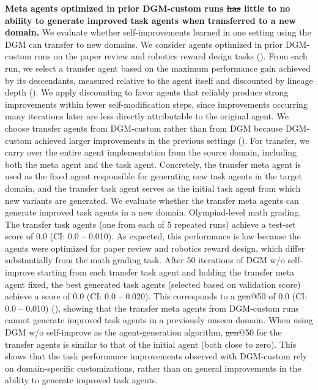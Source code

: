 \documentclass[]{fairmeta}
\providecommand{\DIFaddtex}[1]{{\protect\color{blue}\uwave{#1}}} %
\providecommand{\DIFdeltex}[1]{{\protect\color{red}\sout{#1}}}                      %
\providecommand{\DIFaddbegin}{} %
\providecommand{\DIFaddend}{} %
\providecommand{\DIFdelbegin}{} %
\providecommand{\DIFdelend}{} %
\providecommand{\DIFadd}[1]{\texorpdfstring{\DIFaddtex{#1}}{#1}} %
\providecommand{\DIFdel}[1]{\texorpdfstring{\DIFdeltex{#1}}{}} %
\begin{document}
\textbf{Meta agents optimized in prior DGM-custom runs \DIFdelbegin \DIFdel{has }\DIFdelend \DIFaddbegin \DIFadd{have }\DIFaddend little to no ability to generate improved task agents when transferred to a new domain.}
We evaluate whether self-improvements learned in one setting using the DGM can transfer to new domains. We consider agents optimized in prior DGM-custom runs on the paper review and robotics reward design tasks (). From each run, we select a transfer agent based on the maximum performance gain achieved by its descendants, measured relative to the agent itself and discounted by lineage depth (). We apply discounting to favor agents that reliably produce strong improvements within fewer self-modification steps, since improvements occurring many iterations later are less directly attributable to the original agent. We choose transfer agents from DGM-custom rather than from DGM because DGM-custom achieved larger improvements in the previous settings ().
For transfer, we carry over the entire agent implementation from the source domain, including both the meta agent and the task agent. Concretely, the transfer meta agent is used as the fixed agent responsible for generating new task agents in the target domain, and the transfer task agent serves as the initial task agent from which new variants are generated.
We evaluate whether the transfer meta agents can generate improved task agents in a new domain, Olympiad-level math grading. The transfer task agents (one from each of 5 repeated runs) achieve a test-set score of 0.0 (CI: 0.0 -- 0.010). As expected, this performance is low because the agents were optimized for paper review and robotics reward design, which differ substantially from the math grading task.
After 50 iterations of DGM w/o self-improve starting from each transfer task agent and holding the transfer meta agent fixed, the best generated task agents (selected based on validation score) achieve a score of 0.0 (CI: 0.0 -- 0.020). This corresponds to a \DIFdelbegin \DIFdel{gen}\DIFdelend \DIFaddbegin \DIFadd{imp}\DIFaddend @50 of 0.0 (CI: 0.0 -- 0.010) (), showing that the transfer meta agents from DGM-custom runs cannot generate improved task agents in a previously unseen domain.
When using DGM w/o self-improve as the agent-generation algorithm, \DIFdelbegin \DIFdel{gen}\DIFdelend \DIFaddbegin \DIFadd{imp}\DIFaddend @50 for the transfer agents is similar to that of the initial agent (both close to zero). This shows that the task performance improvements observed with DGM-custom rely on domain-specific customizations, rather than on general improvements in the \DIFaddbegin \DIFadd{meta }\DIFaddend ability to generate improved task agents.
\end{document}
